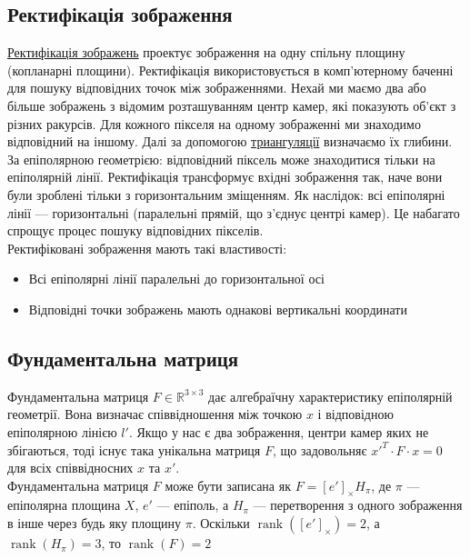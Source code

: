 \subsection{Ректифікація зображення}
\href{https://en.wikipedia.org/wiki/Image_rectification}{Ректифікація зображень} 
проектує зображення на одну спільну площину (копланарні площини). Ректифікація 
використовується в комп'ютерному баченні для пошуку відповідних точок між 
зображеннями. Нехай ми маємо два або більше зображень з відомим розташуванням 
центр камер, які показують об'єкт з різних ракурсів. Для кожного пікселя на 
одному зображенні ми знаходимо відповідний на іншому. Далі за допомогою 
\href{https://en.wikipedia.org/wiki/Triangulation_(computer_vision)}
{триангуляції} визначаємо їх глибини. 
\\
\indent
За епіполярною геометрією: відповідний піксель може знаходитися тільки на 
епіполярній лінії. Ректифікація трансформує вхідні зображення так, наче вони 
були зроблені тільки з горизонтальним зміщенням. Як наслідок: всі епіполярні 
лінії --- горизонтальні (паралельні прямій, що з'єднує центрі камер). Це 
набагато спрощує процес пошуку відповідних пікселів. 
\\
\indent
Ректифіковані зображення мають такі властивості:
\begin{itemize}
 \item{Всі епіполярні лінії паралельні до горизонтальної осі}
 \item{Відповідні точки зображень мають однакові вертикальні координати}
\end{itemize}

\subsection{Фундаментальна матриця}
Фундаментальна матриця $F \in \mathbb{R}^{3\times3}$ дає алгебраїчну 
характеристику епіполярній геометрії. Вона визначає співвідношення між точкою 
$x$ і відповідною епіполярною лінією $l'$. Якщо у нас є два зображення, центри 
камер яких не збігаються, тоді існує така унікальна матриця $F$, що 
задовольняє ${x'}^T \cdot F \cdot x = 0$ для всіх співвідносних $x$ та $x'$.
\\
\indent
Фундаментальна матриця $F$ може бути записана як $F = {[e']}_\times H_\pi$, де 
$\pi$ --- епіполярна площина $X$, $e'$ --- епіполь, а $H_\pi$ --- перетворення з
одного зображення в інше через будь яку площину $\pi$. Оскільки 
$\operatorname{rank}({[e']}_\times) = 2$, а $\operatorname{rank}(H_\pi) = 3$,
то $\operatorname{rank}(F) = 2$ 

